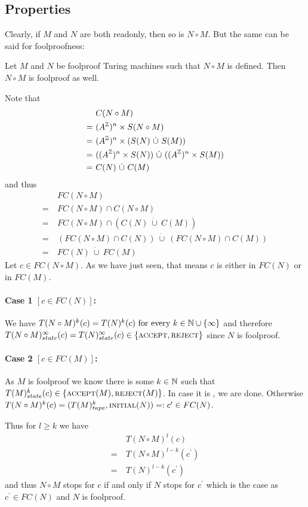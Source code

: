 \subsection{Properties}

Clearly, if $M$ and $N$ are both readonly, then so is $N \circ M$. But the same can be said for foolproofness:

\begin{Lemma} \label{turing_machines:lemma_foolproof_concatenation:lemma}
	Let $M$ and $N$ be foolproof Turing machines such that $N \circ M$ is defined. Then $N \circ M$ is foolproof as well.
\end{Lemma}
\proof
Note that
\begin{align*}
	&C(N \circ M) \\
	=~&(A^{\mathbb{Z}})^n \times S(N \circ M) \\
	=~&(A^{\mathbb{Z}})^n \times (S(N)~\dot\cup~S(M)) \\
	=~&((A^{\mathbb{Z}})^n \times S(N))~\dot\cup~((A^{\mathbb{Z}})^n \times S(M)) \\
	=~&C(N)~\dot\cup~C(M)
\end{align*}
and thus
\begin{align*}
	&FC(N \circ M) \\
	=~&FC(N \circ M) \cap C(N \circ M) \\
	=~&FC(N \circ M) \cap (C(N)~\dot\cup~C(M)) \\
	=~&(FC(N \circ M) \cap C(N))~\dot\cup~(FC(N \circ M) \cap C(M)) \\
	=~&FC(N)~\dot\cup~FC(M)
\end{align*}
Let $c \in FC(N \circ M)$. As we have just seen, that means $c$ is either in $FC(N)$ or in $FC(M)$.
\paragraph{Case 1 $[c \in FC(N)]$:}
We have
$T(N \circ M)^k (c) = T(N)^k (c) ~\text{for every}~ k \in \mathbb{N} \cup \{\infty\}$
and therefore $T(N \circ M)_{state}^\infty(c) = T(N)_{state}^\infty(c) \in \{\text{\scshape{accept}},\text{\scshape{reject}}\}$
since $N$ is foolproof.
\paragraph{Case 2 $[c \in FC(M)]$:}
As $M$ is foolproof we know there is some $k \in \mathbb{N}$ such that $T(M)_{state}^k(c) \in \{\text{\scshape{accept}}(M),\text{\scshape{reject}}(M)\}$.
In case it is \REJ, we are done.
Otherwise $T(N \circ M)^k(c) = (T(M)_{tape}^k,\text{\scshape{initial}}(N)) =: c^\prime \in FC(N)$.

Thus for $l \geq k$ we have
\begin{align*}
	&T(N \circ M)^l(c) \\
	=~&T(N \circ M)^{l-k}(c^\prime) \\
	=~&T(N)^{l-k}(c^\prime)
\end{align*}
and thus $N \circ M$ stops for $c$ if and only if $N$ stops for $c^\prime$ which is the case as $c^\prime \in FC(N)$ and $N$ is foolproof.
\endproof
